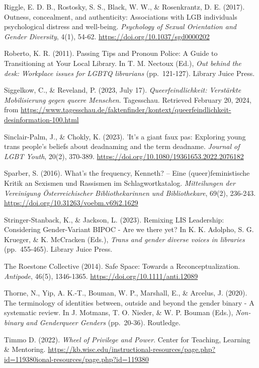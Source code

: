 \documentclass[a4paper,
fontsize=11pt,
oneside,
numbers=noperiodatend,
parskip=half-,
bibliography=totoc,
final
]{scrartcl}
\begin{document}
Riggle, E. D. B., Rostosky, S. S., Black, W. W., \& Rosenkrantz, D. E.
(2017). Outness, concealment, and authenticity: Associations with LGB
individuals\textquotesingle{} psychological distress and well-being.
\emph{Psychology of Sexual Orientation and Gender Diversity}, 4(1),
54-62. \url{https://doi.org/10.1037/sgd0000202}

Roberto, K. R. (2011). Passing Tips and Pronoun Police: A Guide to
Transitioning at Your Local Library. In T. M. Nectoux (Ed.), \emph{Out
behind the desk: Workplace issues for LGBTQ librarians} (pp.~121-127).
Library Juice Press.

Siggelkow, C., \& Reveland, P. (2023, July 17).
\emph{Queerfeindlichkeit: Verstärkte Mobilisierung gegen queere
Menschen}. Tagesschau. Retrieved February 20, 2024, from
\url{https://www.tagesschau.de/faktenfinder/kontext/queerfeindlichkeit-desinformation-100.html}

Sinclair-Palm, J., \& Chokly, K. (2023).
'It's a giant faux pas\textquotesingle:
Exploring young trans people's beliefs about deadnaming
and the term deadname. \emph{Journal of LGBT Youth}, 20(2), 370-389.
\url{https://doi.org/10.1080/19361653.2022.2076182}

Sparber, S. (2016). What's the frequency, Kenneth? --
Eine (queer)feministische Kritik an Sexismen und Rassismen im
Schlagwortkatalog. \emph{Mitteilungen der Vereinigung Österreichischer
Bibliothekarinnen und Bibliothekare}, 69(2), 236-243.
\url{https://doi.org/10.31263/voebm.v69i2.1629}

Stringer-Stanback, K., \& Jackson, L. (2023). Remixing LIS Leadership:
Considering Gender-Vari\-ant BIPOC - Are we there yet? In K. K. Adolpho,
S. G. Krueger, \& K. McCracken (Eds.), \emph{Trans and gender diverse
voices in libraries} (pp.~455-465). Library Juice Press.

The Roestone Collective (2014). Safe Space: Towards a
Reconceptualization. \emph{Antipode}, 46(5), 1346-1365.
\url{https://doi.org/10.1111/anti.12089}

Thorne, N., Yip, A. K.-T., Bouman, W. P., Marshall, E., \& Arcelus, J.
(2020). The terminology of identities between, outside and beyond the
gender binary - A systematic review. In J. Motmans, T. O. Nieder, \& W.
P. Bouman (Eds.), \emph{Non-binary and Genderqueer Genders} (pp.~20-36).
Routledge.

Timmo D. (2022). \emph{Wheel of Privilege and Power}. Center for
Teaching, Learning \& Mentoring.
\url{https://kb.wisc.edu/instructional-resources/page.php?id=119380ional-resources/page.php?id=119380}
\end{document}
